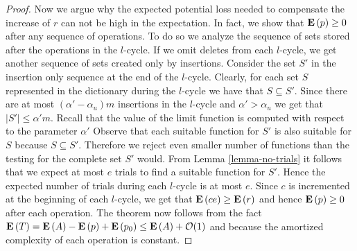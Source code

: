 \begin{proof}
Now we argue why the expected potential loss needed to compensate the increase of $r$ can not be high in the expectation.
In fact, we show that $\mathbf{E}\left(p\right) \geq 0$ after any sequence of operations.
To do so we analyze the sequence of sets stored after the operations in the $l$-cycle.
If we omit deletes from each $l$-cycle, we get another sequence of sets created only by insertions.
Consider the set $S'$ in the insertion only sequence at the end of the $l$-cycle. 
Clearly, for each set $S$ represented in the dictionary during the $l$-cycle we have that $S \subseteq S'$. 
Since there are at most $(\alpha' - \alpha_u)m$ insertions in the $l$-cycle and $\alpha' > \alpha_u$ we get that $|S'| \leq \alpha' m$.
Recall that the value of the limit function is computed with respect to the parameter $\alpha'$
Observe that each suitable function for $S'$ is also suitable for $S$ because $S \subseteq S'$. 
Therefore we reject even smaller number of functions than the testing for the complete set $S'$ would. 
From Lemma \ref{lemma-no-trials} it follows that we expect at most $e$ trials to find a suitable function for $S'$. 
Hence the expected number of trials during each $l$-cycle is at most $e$. 
Since $c$ is incremented at the beginning of each $l$-cycle, we get that $\mathbf{E}\left(ce\right) \geq \mathbf{E}\left(r\right)$ and hence $\mathbf{E}\left(p\right) \geq 0$ after each operation.
The theorem now follows from the fact $\mathbf{E}\left(T\right) = \mathbf{E}\left(A\right) - \mathbf{E}\left(p\right) + \mathbf{E}\left(p_0\right) \leq \mathbf{E}\left(A\right) + \mathcal{O}(1)$ and because the amortized complexity of each operation is constant.
\end{proof}
